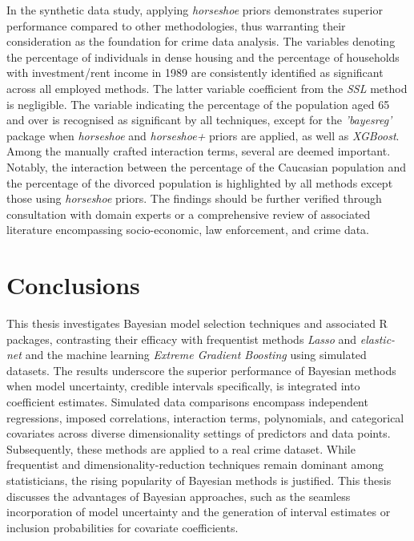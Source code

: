 \documentclass[
  11pt,
]{article}
\begin{document}
In the synthetic data study, applying \emph{horseshoe} priors
demonstrates superior performance compared to other methodologies, thus
warranting their consideration as the foundation for crime data
analysis. The variables denoting the percentage of individuals in dense
housing and the percentage of households with investment/rent income in
1989 are consistently identified as significant across all employed
methods. The latter variable coefficient from the \emph{SSL} method is
negligible. The variable indicating the percentage of the population
aged 65 and over is recognised as significant by all techniques, except
for the \emph{'bayesreg'} package when \emph{horseshoe} and
\emph{horseshoe+} priors are applied, as well as \emph{XGBoost}. Among
the manually crafted interaction terms, several are deemed important.
Notably, the interaction between the percentage of the Caucasian
population and the percentage of the divorced population is highlighted
by all methods except those using \emph{horseshoe} priors. The findings
should be further verified through consultation with domain experts or a
comprehensive review of associated literature encompassing
socio-economic, law enforcement, and crime data.

\newpage

\section{Conclusions}

This thesis investigates Bayesian model selection techniques and
associated R packages, contrasting their efficacy with frequentist
methods \emph{Lasso} and \emph{elastic-net} and the machine learning
\emph{Extreme Gradient Boosting} using simulated datasets. The results
underscore the superior performance of Bayesian methods when model
uncertainty, credible intervals specifically, is integrated into
coefficient estimates. Simulated data comparisons encompass independent
regressions, imposed correlations, interaction terms, polynomials, and
categorical covariates across diverse dimensionality settings of
predictors and data points. Subsequently, these methods are applied to a
real crime dataset. While frequentist and dimensionality-reduction
techniques remain dominant among statisticians, the rising popularity of
Bayesian methods is justified. This thesis discusses the advantages of
Bayesian approaches, such as the seamless incorporation of model
uncertainty and the generation of interval estimates or inclusion
probabilities for covariate coefficients.
\end{document}
